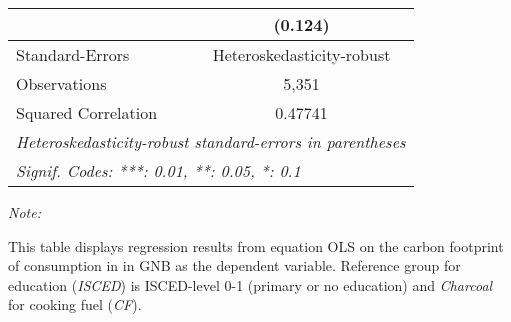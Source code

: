 \begin{table}[htbp!]
\begin{adjustbox}{width = 1\textwidth, max height = 0.95\textheight, center}
\begin{threeparttable}[b]
\begin{tabular}{lc}
                                & (0.124)\\   
            \midrule 
            Standard-Errors     & Heteroskedasticity-robust \\   
            Observations        & 5,351\\  
            Squared Correlation & 0.47741\\  
            \midrule \midrule
            \multicolumn{2}{l}{\emph{Heteroskedasticity-robust standard-errors in parentheses}}\\
            \multicolumn{2}{l}{\emph{Signif. Codes: ***: 0.01, **: 0.05, *: 0.1}}\\
         \end{tabular}
         
         \begin{tablenotes}\item \medskip \textit{Note:}
            \item This table displays regression results from equation OLS on the carbon footprint of consumption in  in GNB as the dependent variable.  Reference group for education (\textit{ISCED}) is ISCED-level 0-1 (primary or no education) and \textit{Charcoal} for cooking fuel (\textit{CF}).
         \end{tablenotes}
      \end{threeparttable}
   \end{adjustbox}
\end{table}


